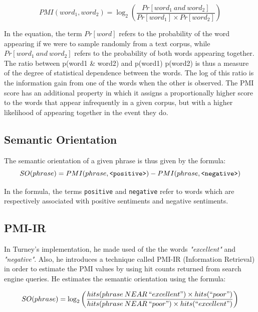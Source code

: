 \documentclass[11pt]{report} %
\begin{document}
\begin{equation*} PMI(word_1, word_2) = \log_2 \left(\frac{Pr[word_1 \: and \: word_2]}{Pr[word_1] \times Pr[word_2]}\right) \end{equation*}

In the equation, the term $Pr[word]$ refers to the probability of the word appearing if we were to sample randomly from a text corpus, while  $Pr[word_1 \: and \: word_2]$ refers to the probability of both words appearing together. The ratio between p(word1 \& word2) and p(word1) p(word2) is thus a measure of the degree of statistical dependence between the words. The log of this ratio is the information gain from one of the words when the other is observed. The PMI score has an additional property in which it assigns a proportionally higher score to the words that appear infrequently in a given corpus, but with a higher likelihood of appearing together in the event they do\cite{Vargas2010}. 

\subsection{Semantic Orientation}
The semantic orientation of a given phrase is thus given by the formula:
\begin{equation*} SO(phrase) = PMI(phrase, \verb|<positive>|) - PMI(phrase, \verb|<negative>|)\end{equation*}

In the formula, the terms \verb|positive| and \verb|negative| refer to words which are respectively associated with positive sentiments and negative sentiments. 

\subsection{PMI-IR}
In Turney's implementation, he made used of the the words \textit{"excellent"} and \textit{"negative"}. Also, he introduces a technique called PMI-IR (Information Retrieval) in order to estimate the PMI values by using hit counts returned from search engine queries. He estimates the semantic orientation using the formula:

\begin{equation*} SO(phrase) = \log_2 \left(\frac{hits(phrase \: NEAR \: ``excellent") \times hits(``poor") }{hits(phrase \: NEAR \: ``poor") \times hits(``excellent") }\right) \end{equation*}
\end{document}

